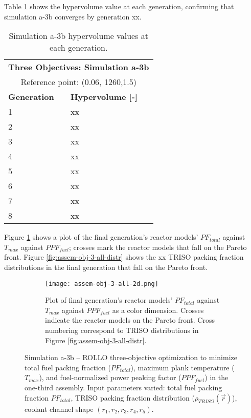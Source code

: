 Table \ref{tab:a3b-hypervolume} shows the hypervolume value at each generation, 
confirming that simulation a-3b converges by generation xx. 
\begin{table}[htbp!]
    \centering
    \onehalfspacing
    \caption{Simulation a-3b hypervolume values at each generation.}
	\label{tab:a3b-hypervolume}
    \footnotesize
    \begin{tabular}{ll}
    \hline 
    \multicolumn{2}{c}{\textbf{Three Objectives: Simulation a-3b}} \\
    \multicolumn{2}{c}{Reference point: (0.06, 1260,1.5)} \\
    \hline 
    \textbf{Generation} & \textbf{Hypervolume [-]} \\
    \hline
    1 & xx \\
    2 & xx \\
    3 & xx \\
    4 & xx \\
    5 & xx \\
    6 & xx \\
    7 & xx \\
    8 & xx \\
    \hline
    \end{tabular}
\end{table}

Figure \ref{fig:assem-obj-3-all-2d} shows a plot of the final generation's reactor 
models' $PF_{total}$ against $T_{max}$ against $PPF_{fuel}$; crosses mark the reactor 
models that fall on the Pareto front.
Figure \ref{fig:assem-obj-3-all-distr} shows the xx TRISO packing fraction distributions in 
the final generation that fall on the Pareto front. 
\begin{figure}[htbp!]
    \begin{subfigure}{\textwidth}
        \centering
        \texttt{[image: assem-obj-3-all-2d.png]}
        \caption{Plot of final generation's reactor models' $PF_{total}$ against 
        $T_{max}$ against $PPF_{fuel}$ as a color dimension. 
        Crosses indicate the reactor models on the 
        Pareto front. Cross numbering correspond to TRISO distributions in Figure 
        \ref{fig:assem-obj-3-all-distr}.}
        \label{fig:assem-obj-3-all-2d} 
    \end{subfigure}
    \caption{Simulation a-3b -- ROLLO three-objective optimization to minimize total 
    fuel packing fraction ($PF_{total}$), maximum plank temperature ($T_{max}$), and 
    fuel-normalized power peaking factor ($PPF_{fuel}$) in the one-third assembly. 
    Input parameters varied: total fuel packing fraction $PF_{total}$, 
    TRISO packing fraction distribution ($\rho_{TRISO}(\vec{r})$), 
    coolant channel shape $(r_1, r_2, r_3, r_4, r_5)$.}
    \label{fig:assem-obj-3-all}
\end{figure}


